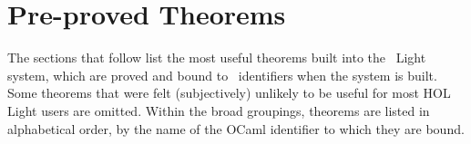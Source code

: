 \chapter{Pre-proved Theorems}

The sections that follow list the most useful theorems built into the
\HOL\ Light system, which are proved and bound to \ML\ identifiers when the
system is built. Some theorems that were felt (subjectively) unlikely to be
useful for most HOL Light users are omitted. Within the broad groupings,
theorems are listed in alphabetical order, by the name of the OCaml identifier
to which they are bound.
